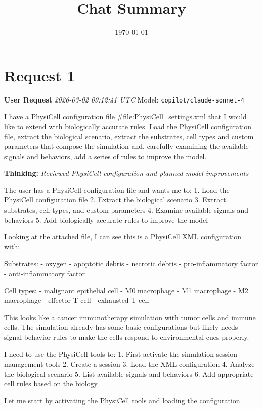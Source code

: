 \documentclass[11pt,a4paper]{article}
\title{Chat Summary}
\date{\today}
\begin{document}
\maketitle
\tableofcontents
\newpage

\section{Request 1}
\begin{userbox}
\textbf{User Request}
\quad \textit{2026-03-02 09:12:41 UTC}
\quad Model: \texttt{copilot/claude-sonnet-4}

I have a PhysiCell configuration file \#file:PhysiCell\_settings.xml  that I would like to extend with biologically accurate rules. Load the PhysiCell configuration file, extract the biological scenario, extract the substrates, cell types and custom parameters that compose the simulation and, carefully examining the available signals and behaviors, add a series of rules to improve the model.

\end{userbox}
\begin{thinkbox}
\textbf{Thinking:} \textit{Reviewed PhysiCell configuration and planned model improvements}

The user has a PhysiCell configuration file and wants me to:
1. Load the PhysiCell configuration file
2. Extract the biological scenario
3. Extract substrates, cell types, and custom parameters
4. Examine available signals and behaviors 
5. Add biologically accurate rules to improve the model

Looking at the attached file, I can see this is a PhysiCell XML configuration with:

Substrates:
- oxygen
- apoptotic debris  
- necrotic debris
- pro-inflammatory factor
- anti-inflammatory factor

Cell types:
- malignant epithelial cell
- M0 macrophage
- M1 macrophage
- M2 macrophage
- effector T cell
- exhausted T cell

This looks like a cancer immunotherapy simulation with tumor cells and immune cells. The simulation already has some basic configurations but likely needs signal-behavior rules to make the cells respond to environmental cues properly.

I need to use the PhysiCell tools to:
1. First activate the simulation session management tools
2. Create a session
3. Load the XML configuration 
4. Analyze the biological scenario
5. List available signals and behaviors
6. Add appropriate cell rules based on the biology

Let me start by activating the PhysiCell tools and loading the configuration.

\end{thinkbox}
\end{document}
